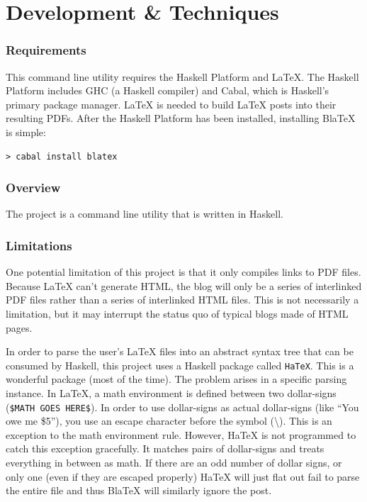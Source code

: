 \documentclass[doc,apacite,12pt]{apa6}
\begin{document}
\section{Development \& Techniques}

\subsubsection{Requirements}
This command line utility requires the Haskell Platform and LaTeX. The Haskell Platform includes GHC (a Haskell compiler) and Cabal, which is Haskell's primary package manager. LaTeX is needed to build LaTeX posts into their resulting PDFs. After the Haskell Platform has been installed, installing BlaTeX is simple:

\begin{lstlisting}
> cabal install blatex
\end{lstlisting}

\subsubsection{Overview}
The project is a command line utility that is written in Haskell. 

\subsubsection{Limitations}

One potential limitation of this project is that it only compiles links to PDF files. Because LaTeX can't generate HTML, the blog will only be a series of interlinked PDF files rather than a series of interlinked HTML files. This is not necessarily a limitation, but it may interrupt the status quo of typical blogs made of HTML pages. 

In order to parse the user's LaTeX files into an abstract syntax tree that can be consumed by Haskell, this project uses a Haskell package called \texttt{HaTeX}. This is a wonderful package (most of the time). The problem arises in a specific parsing instance. In LaTeX, a math environment is defined between two dollar-signs (\texttt{\$MATH GOES HERE\$}). In order to use dollar-signs as actual dollar-signs (like ``You owe me \$5''), you use an escape character before the symbol (\textbackslash). This is an exception to the math environment rule. However, HaTeX is not programmed to catch this exception gracefully. It matches pairs of dollar-signs and treats everything in between as math. If there are an odd number of dollar signs, or only one (even if they are escaped properly) HaTeX will just flat out fail to parse the entire file and thus BlaTeX will similarly ignore the post. 
\end{document}
